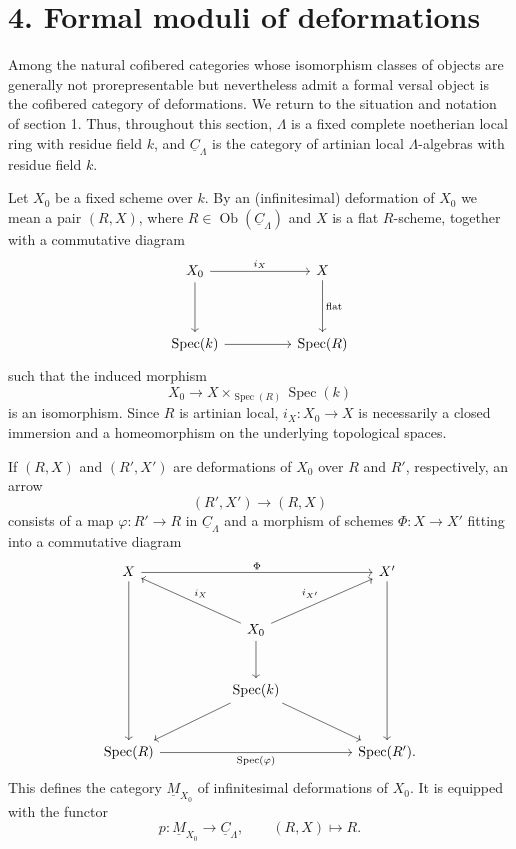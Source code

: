 
\section*{4. Formal moduli of deformations}

Among the natural cofibered categories whose isomorphism classes of
objects are generally not prorepresentable but nevertheless admit a
formal versal object is the cofibered category of deformations. We
return to the situation and notation of section 1. Thus, throughout
this section, $\Lambda$ is a fixed complete noetherian local ring with
residue field $k$, and $\underline C_\Lambda$ is the category of
artinian local $\Lambda$-algebras with residue field $k$.

Let $X_0$ be a fixed scheme over $k$. By an (infinitesimal)
deformation of $X_0$ we mean a pair $(R,X)$, where
$R\in\operatorname{Ob}(\underline C_\Lambda)$ and $X$ is a flat
$R$-scheme, together with a commutative diagram
\[
\begin{tikzcd}[column sep=huge,row sep=huge]
X_0 \arrow[r,"i_X"] \arrow[d] & X \arrow[d,"\mathrm{flat}"] \\
\operatorname{Spec}(k) \arrow[r] & \operatorname{Spec}(R)
\end{tikzcd}
\]
such that the induced morphism
\[
 X_0\longrightarrow
 X\times_{\operatorname{Spec}(R)}\operatorname{Spec}(k)
\]
is an isomorphism. Since $R$ is artinian local,
$i_X:X_0\longrightarrow X$ is necessarily a closed immersion and a
homeomorphism on the underlying topological spaces.


If $(R,X)$ and $(R',X')$ are deformations of $X_0$ over $R$ and
$R'$, respectively, an arrow
\[
 (R',X')\longrightarrow(R,X)
\]
consists of a map $\varphi:R'\longrightarrow R$ in
$\underline C_\Lambda$ and a morphism of schemes
$\Phi:X\longrightarrow X'$ fitting into a commutative diagram
\[
\begin{tikzcd}[column sep=huge,row sep=large]
X \arrow[rr,"\Phi"] \arrow[ddd] && X' \arrow[ddd] \\
& X_0 \arrow[ul,"i_X"'] \arrow[ur,"i_{X'}"] \arrow[d] & \\
& \operatorname{Spec}(k) \arrow[dl] \arrow[dr] & \\
\operatorname{Spec}(R)
 \arrow[rr,"\operatorname{Spec}(\varphi)"']
&& \operatorname{Spec}(R').
\end{tikzcd}
\]
This defines the category $\underline M_{X_0}$ of infinitesimal
deformations of $X_0$. It is equipped with the functor
\[
 p:\underline M_{X_0}\longrightarrow\underline C_\Lambda,
 \qquad (R,X)\longmapsto R.
\]

